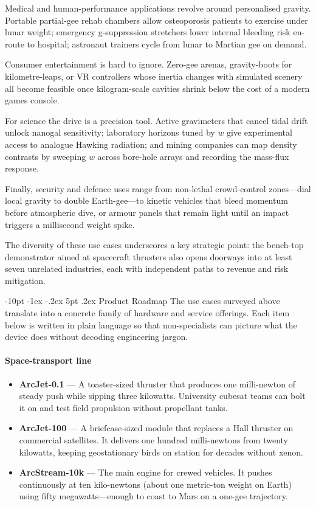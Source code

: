 \documentclass[12pt,letterpaper]{book}
\makeatletter
\renewcommand\section{\@startsection{section}{1}{\z@}%
  {-8pt \@plus -1ex \@minus -.2ex}%
  {4pt \@plus.2ex}%
  {\normalfont\large\bfseries}}
\renewcommand\section{\@startsection {section}{1}{\z@}%
                {-10pt \@plus -1ex \@minus -.2ex}%
                {5pt \@plus.2ex}%
                {\normalfont\large\bfseries}}
\makeatother
\begin{document}
Medical and human-performance applications revolve around personalised gravity.  Portable partial-gee rehab chambers allow osteoporosis patients to exercise under lunar weight; emergency g-suppression stretchers lower internal bleeding risk en-route to hospital; astronaut trainers cycle from lunar to Martian gee on demand.

Consumer entertainment is hard to ignore.  Zero-gee arenas, gravity-boots for kilometre-leaps, or VR controllers whose inertia changes with simulated scenery all become feasible once kilogram-scale cavities shrink below the cost of a modern games console.

For science the drive is a precision tool.  Active gravimeters that cancel tidal drift unlock nanogal sensitivity; laboratory horizons tuned by $w$ give experimental access to analogue Hawking radiation; and mining companies can map density contrasts by sweeping $w$ across bore-hole arrays and recording the mass-flux response.

Finally, security and defence uses range from non-lethal crowd-control zones—dial local gravity to double Earth-gee—to kinetic vehicles that bleed momentum before atmospheric dive, or armour panels that remain light until an impact triggers a millisecond weight spike.

The diversity of these use cases underscores a key strategic point: the bench-top demonstrator aimed at spacecraft thrusters also opens doorways into at least seven unrelated industries, each with independent paths to revenue and risk mitigation.

\section{Product Roadmap}\label{chap:products}
The use cases surveyed above translate into a concrete family of hardware and service offerings.  Each item below is written in plain language so that non-specialists can picture what the device does without decoding engineering jargon.

\paragraph{Space-transport line}
\begin{itemize}
 \item \textbf{ArcJet-0.1} — A toaster-sized thruster that produces one milli-newton of steady push while sipping three kilowatts.  University cubesat teams can bolt it on and test field propulsion without propellant tanks.
 \item \textbf{ArcJet-100} — A briefcase-sized module that replaces a Hall thruster on commercial satellites.  It delivers one hundred milli-newtons from twenty kilowatts, keeping geostationary birds on station for decades without xenon.
 \item \textbf{ArcStream-10k} — The main engine for crewed vehicles.  It pushes continuously at ten kilo-newtons (about one metric-ton weight on Earth) using fifty megawatts—enough to coast to Mars on a one-gee trajectory.
\end{itemize}
\end{document}
